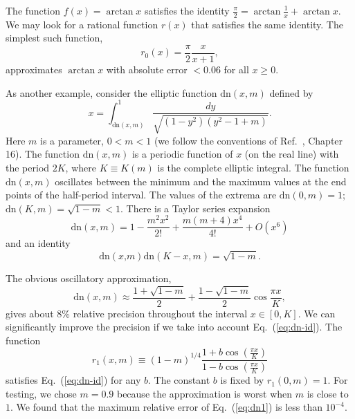 \documentclass{llncs}
\begin{document}
The function $f\left(x\right)=\arctan x$ satisfies the identity $\frac{\pi }{2}=\arctan \frac{1}{x}+\arctan x.$
We may look for a rational function $r\left(x\right)$ that satisfies
the same identity. The simplest such function,\begin{equation}
r_{0}\left(x\right)=\frac{\pi }{2}\frac{x}{x+1},\end{equation}
approximates $\arctan x$ with absolute error $<0.06$ for all $x\geq 0$.

As another example, consider the elliptic function $\textrm{dn}\left(x,m\right)$
defined by\begin{equation}
x=\int _{\textrm{dn}\left(x,m\right)}^{1}\frac{dy}{\sqrt{\left(1-y^{2}\right)\left(y^{2}-1+m\right)}}.\end{equation}
 Here $m$ is a parameter, $0<m<1$ (we follow the conventions of
Ref.~\cite{AS64}, Chapter 16). The function $\textrm{dn}\left(x,m\right)$
is a periodic function of $x$ (on the real line) with the period
$2K$, where $K\equiv K\left(m\right)$ is the complete elliptic integral.
The function $\textrm{dn}\left(x,m\right)$ oscillates between the
minimum and the maximum values at the end points of the half-period
interval. The values of the extrema are $\textrm{dn}\left(0,m\right)=1$;
$\textrm{dn}\left(K,m\right)=\sqrt{1-m}<1$. There is a Taylor series
expansion\begin{equation}
\textrm{dn}\left(x,m\right)=1-\frac{m^{2}x^{2}}{2!}+\frac{m\left(m+4\right)x^{4}}{4!}+O\left(x^{6}\right)\label{eq:dn-taylor}\end{equation}
and an identity\begin{equation}
\textrm{dn}\left(x\textrm{,}m\right)\textrm{dn}\left(K-x,m\right)=\sqrt{1-m}.\label{eq:dn-id}\end{equation}


The obvious oscillatory approximation,\begin{equation}
\textrm{dn}\left(x,m\right)\approx \frac{1+\sqrt{1-m}}{2}+\frac{1-\sqrt{1-m}}{2}\cos \frac{\pi x}{K},\label{eq:dn0}\end{equation}
 gives about 8\% relative precision throughout the interval $x\in \left[0,K\right]$.
We can significantly improve the precision if we take into account
Eq.~(\ref{eq:dn-id}). The function\begin{equation}
r_{1}\left(x,m\right)\equiv \left(1-m\right)^{1/4}\frac{1+b\cos \left(\frac{\pi x}{K}\right)}{1-b\cos \left(\frac{\pi x}{K}\right)}\label{eq:dn1}\end{equation}
satisfies Eq.~(\ref{eq:dn-id}) for any $b$. The constant $b$ is
fixed by $r_{1}\left(0,m\right)=1$. For testing, we chose $m=0.9$
because the approximation is worst when $m$ is close to $1$. We
found that the maximum relative error of Eq.~(\ref{eq:dn1}) is less
than $10^{-4}$. 
\end{document}
